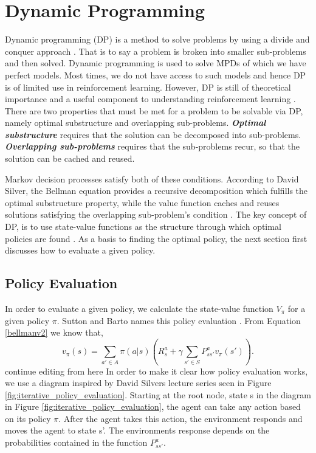 \graphicspath{{Dynamic\_Programming/fig/}}

\chapter{Dynamic Programming}
\label{chap:Dynamic_Programming}

Dynamic programming (DP) is a method to solve problems by using a divide and conquer approach \cite{David_Silver}. That is to say a problem is broken into smaller sub-problems and then solved. Dynamic programming is used to solve MPDs of which we have perfect models. Most times, we do not have access to such models and hence DP is of limited use in reinforcement learning. However, DP is still of theoretical importance and a useful component to understanding reinforcement learning \cite{sutton_barto}.
There are two properties that must be met for a problem to be solvable via DP, namely optimal substructure and overlapping sub-problems\cite{David_Silver}.
\emph{\textbf{Optimal substructure}} requires that the solution can be decomposed into sub-problems. \emph{\textbf{Overlapping sub-problems}} requires that the sub-problems recur, so that the solution can be cached and reused.

Markov decision processes satisfy both of these conditions. According to David Silver, the Bellman equation provides a recursive decomposition which fulfills the optimal substructure property, while the value function caches and reuses solutions satisfying the overlapping sub-problem's condition \cite{David_Silver}.
The key concept of DP, is to use state-value functions as the structure through which optimal policies are found \cite{sutton_barto}. As a basis to finding the optimal policy, the next section first discusses how to evaluate a given policy.
\section{Policy Evaluation}
In order to evaluate a given policy, we calculate the state-value function $V_{\pi}$ for a given policy $\pi$. Sutton and Barto names this policy evaluation \cite{sutton_barto}.
From Equation \ref{bellmanv2} we know that,
\[
v_{\pi}(s) = \sum_{a'\in A}\pi(a|s)(R^{a}_s+\gamma\sum_{s'\in S}P^{a}_{ss'}v_\pi(s')).
\]
{\color{red} \huge continue editing from here}
In order to make it clear how policy evaluation works, we use a diagram inspired by David Silvers lecture series \cite{David_Silver} seen in Figure \ref{fig:iterative_policy_evaluation}.
Starting at the root node, state s in the diagram in Figure \ref{fig:iterative_policy_evaluation}, the agent can take any action based on its policy $\pi$. After the agent takes this action, the environment responds and moves the agent to state s'. The environments response depends on the probabilities contained in the function $P^{a}_{ss'}$. 

